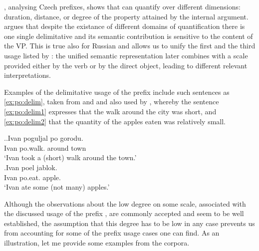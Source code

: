 \citet{Souchkova:04}, analysing Czech prefixes, shows that  can quantify over different dimensions: duration, distance, or degree of the property attained by the internal argument. \citeauthor{Souchkova:04} argues that despite the existance of different domains of quantification there is one single delimitative  and its semantic contribution is sensitive to the content of the VP. This is true also for Russian and allows us to unify the first and the third usage listed by \citet{Shvedova:82}: the unified semantic representation later combines with a scale provided either by the verb or by the direct object, leading to different relevant interpretations.

Examples of the delimitative usage of the prefix  include such sentences as \ref{ex:po:delim}, taken from \citet{Filip:00} and \citet{Souchkova:04} and also used by \citet{Kagan:book}, whereby the sentence \ref{ex:po:delim1} expresses that the walk around the city was short, and \ref{ex:po:delim2} that the quantity of the apples eaten was relatively small.

\ex.\label{ex:po:delim}\ag.\label{ex:po:delim1}Ivan poguljal po gorodu.\\
Ivan po.walk. around town\\
\trans `Ivan took a (short) walk around the town.'\\
\bg.\label{ex:po:delim2}Ivan poel jablok.\\
Ivan po.eat. apple.\\
\trans `Ivan ate some (not many) apples.'


Although the observations about the low degree on some scale, associated with the discussed usage of the prefix , are commonly accepted and seem to be well established, the assumption that this degree has to be low in any case prevents us from accounting for some of the prefix usage cases one can find. As an illustration, let me provide some examples from the corpora.

